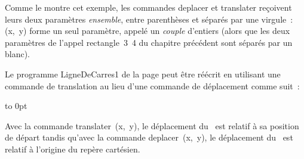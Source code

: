 \noindent Comme le montre cet exemple, les commandes {\idt deplacer} et {\idt translater}
reçoivent leurs deux paramètres {\em ensemble}, entre parenthèses et séparés par une virgule~:
{\idt (x,\ y)} forme un seul paramètre, appelé un {\em couple} d'entiers (alors que
les deux paramètres de l'appel {\idt rectangle\ 3\ 4} du chapitre précédent sont séparés
par un blanc).


Le programme {\idt LigneDeCarres1} de la page
\pageref{prog:LigneDeCarres1} peut être réécrit en uti\-li\-sant une
commande de translation au lieu d'une commande de dé\-pla\-ce\-ment
com\-me suit~:\\
{\raggedright%
\vspace{\baselineskip}%
\vbox to 0pt{\vspace*{\baselineskip}\vspace*{6cm}%
}%
\vspace*{-1cm}%

}
 
 Avec la commande {\idt translater\ (x,\ y)}, le déplacement du \robot\ est relatif à sa position de
départ tandis qu'avec la commande {\idt deplacer\ (x,\ y)}, le déplacement du \robot\ est relatif 
à l'origine du repère cartésien.
 
